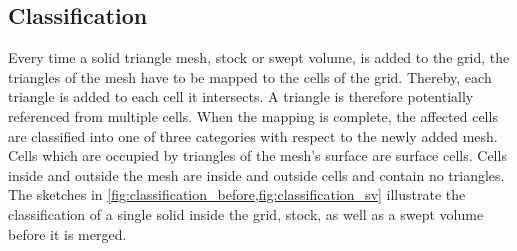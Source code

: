\subsection{Classification}
\label{sec:classification}

Every time a solid triangle mesh, stock or swept volume, is added to the grid, the triangles of the mesh have to be mapped to the cells of the grid.
Thereby, each triangle is added to each cell it intersects.
A triangle is therefore potentially referenced from multiple cells.
When the mapping is complete, the affected cells are classified into one of three categories with respect to the newly added mesh.
Cells which are occupied by triangles of the mesh's surface are surface cells.
Cells inside and outside the mesh are inside and outside cells and contain no triangles.
The sketches in \cref{fig:classification_before,fig:classification_sv} illustrate the classification of a single solid inside the grid, \ie stock, as well as a swept volume before it is merged.

